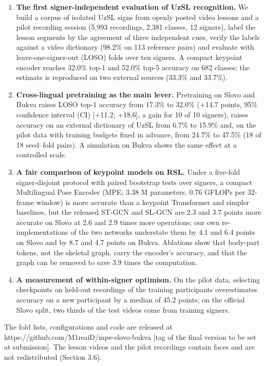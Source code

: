 \documentclass[a4paper,fleqn]{cas-dc}
\providecommand{\tightlist}{\setlength{\itemsep}{0pt}\setlength{\parskip}{0pt}}
\begin{document}
\begin{enumerate}
\def\labelenumi{\arabic{enumi}.}
\tightlist
\item
  \textbf{The first signer-independent evaluation of UzSL recognition.} We build a corpus of isolated UzSL signs from openly posted video lessons and a pilot recording session (5,993 recordings, 2,381 classes, 12 signers), label the lesson segments by the agreement of three independent cues, verify the labels against a video dictionary (98.2\% on 113 reference pairs) and evaluate with leave-one-signer-out (LOSO) folds over ten signers. A compact keypoint encoder reaches 32.0\% top-1 and 52.0\% top-5 accuracy on 682 classes; the estimate is reproduced on two external sources (33.3\% and 33.7\%).
\item
  \textbf{Cross-lingual pretraining as the main lever.} Pretraining on Slovo and Bukva raises LOSO top-1 accuracy from 17.3\% to 32.0\% (+14.7 points, 95\% confidence interval (CI) {[}+11.2; +18.6{]}, a gain for 10 of 10 signers), raises accuracy on an external dictionary of UzSL from 6.7\% to 15.9\% and, on the pilot data with training budgets fixed in advance, from 24.7\% to 47.5\% (18 of 18 seed--fold pairs). A simulation on Bukva shows the same effect at a controlled scale.
\item
  \textbf{A fair comparison of keypoint models on RSL.} Under a five-fold signer-disjoint protocol with paired bootstrap tests over signers, a compact Multilingual Pose Encoder (MPE; 3.38 M parameters, 0.76 GFLOPs per 32-frame window) is more accurate than a keypoint Transformer and simpler baselines, but the released ST-GCN \cite{2018_yan_stgcn} and SL-GCN \cite{2021_jiang_sam_slr} are 2.3 and 3.7 points more accurate on Slovo at 2.6 and 2.9 times more operations; our own re-implementations of the two networks understate them by 4.1 and 6.4 points on Slovo and by 8.7 and 4.7 points on Bukva. Ablations show that body-part tokens, not the skeletal graph, carry the encoder's accuracy, and that the graph can be removed to save 3.9 times the computation.
\item
  \textbf{A measurement of within-signer optimism.} On the pilot data, selecting checkpoints on held-out recordings of the training participants overestimates accuracy on a new participant by a median of 45.2 points; on the official Slovo split, two thirds of the test videos come from training signers.
\end{enumerate}

The fold lists, configurations and code are released at https://github.com/M1rsaiD/mpe-slovo-bukva {\color{red}[tag of the final version to be set at submission]}. The lesson videos and the pilot recordings contain faces and are not redistributed (Section 3.6).
\end{document}
